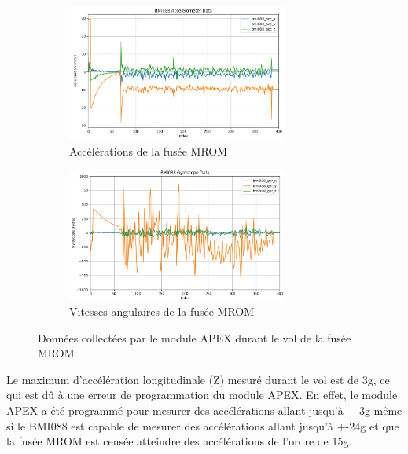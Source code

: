 \documentclass{article}
\begin{document}
\begin{figure}[h!]
    \centering
    \begin{subfigure}{\textwidth}
        \centering
        \includegraphics[width=0.8\textwidth]{image/MROM_acc.png}
        \caption{Accélérations de la fusée MROM}
        \label{fig:mrom_acc}
    \end{subfigure}
    \begin{subfigure}{\textwidth}
        \centering
        \includegraphics[width=0.8\textwidth]{image/MROM_gry.png}
        \caption{Vitesses angulaires de la fusée MROM}
        \label{fig:mrom_gyro}
    \end{subfigure}
    \caption{Données collectées par le module APEX durant le vol de la fusée MROM}
    \label{fig:mrom_data}
\end{figure}

Le maximum d'accélération longitudinale (Z) mesuré durant le vol est de 3g, ce qui est dû à une
erreur de programmation du module APEX. En effet, le module APEX a été programmé pour
mesurer des accélérations allant jusqu'à +-3g même si le BMI088 est capable de mesurer des
accélérations allant jusqu'à +-24g et que la fusée MROM est censée atteindre des
accélérations de l'ordre de 15g.

\newpage
\end{document}
